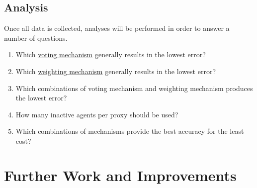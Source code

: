 \subsection{Analysis}\label{subsec:analysis}
Once all data is collected, analyses will be performed in order to answer a
number of questions.
\begin{enumerate}[label=\textbf{Q\arabic*}., leftmargin=2\parindent]
    \item Which \hyperref[subsec:voting-mechanisms]{voting mechanism}
    generally results in the lowest error?

    \item Which \hyperref[subsec:weighting-mechanisms]{weighting mechanism}
    generally results in the lowest error?

    \item Which combinations of voting mechanism and weighting mechanism
    produces the lowest error?

    \item How many inactive agents per proxy should be used?

    \item Which combinations of mechanisms provide the best accuracy for the
    least cost?
\end{enumerate}


\section{Further Work and Improvements}\label{sec:further-work-and-improvements}

